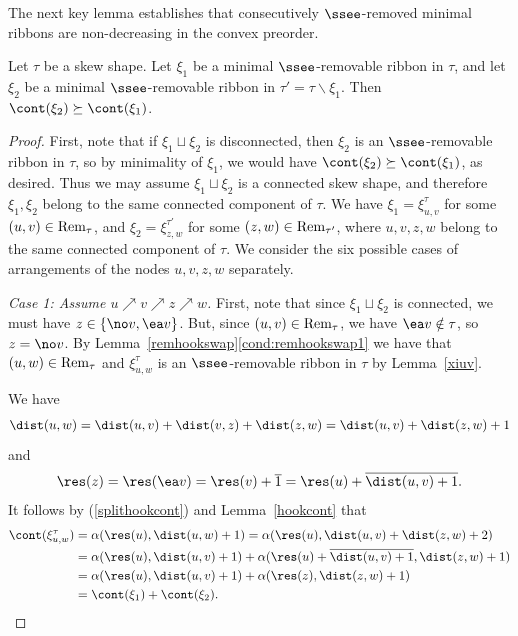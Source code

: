 The next key lemma establishes that consecutively \(\ssee\)-removed minimal ribbons are non-decreasing in the convex preorder. 

 \begin{lemma}\label{remsinorder}
Let \(\tau\) be a skew shape. Let \(\xi_1\) be a minimal \(\ssee\)-removable ribbon in \(\tau\), and let \(\xi_2\) be a minimal \(\ssee\)-removable ribbon in \(\tau'=\tau\backslash \xi_1\). Then \(\cont(\xi_2) \succeq \cont(\xi_1)\).
 \end{lemma}
 \begin{proof}
First, note that if \(\xi_1 \sqcup \xi_2\) is disconnected, then \(\xi_2\) is an \(\ssee\)-removable ribbon in \(\tau\), so by minimality of \(\xi_1\), we would have \(\cont(\xi_2) \succeq \cont(\xi_1)\), as desired. Thus we may assume \(\xi_1 \sqcup \xi_2\) is a connected skew shape, and therefore \(\xi_1, \xi_2\) belong to the same connected component of \(\tau\). 
  We have \(\xi_1 = \xi^\tau_{u,v}\) for some \((u,v) \in \textup{Rem}_\tau\), and \(\xi_2 = \xi^{\tau'}_{z,w}\) for some \((z,w) \in \textup{Rem}_{\tau'}\), where \(u,v,z,w\) belong to the same connected component of \(\tau\).  
We consider the six possible cases of arrangements of the nodes \(u,v,z,w\) separately.
 
 {\em Case 1: Assume \(u \nearrow v \nearrow z \nearrow w\).} First, note that since \(\xi_1 \sqcup \xi_2\) is connected, we must have \(z \in \{\no v, \ea v\}\). But, since \((u,v) \in \textup{Rem}_\tau\), we have \(\ea v \notin \tau\), so \(z=\no v\). 
By Lemma~\ref{remhookswap}\eqref{cond:remhookswap1} we have that \((u,w) \in \textup{Rem}_\tau\) and \(\xi^\tau_{u,w}\) is an \(\ssee\)-removable ribbon in \(\tau\) by Lemma~\ref{xiuv}.
 
We have
\begin{align*}
\dist(u,w) = 
\dist(u,v) + \dist(v,z) + \dist(z,w) = 
 \dist(u,v) + \dist(z,w) + 1
\end{align*}
and
\begin{align*}
\res(z) = \res(\ea v) = \res(v) + \overline{1} = \res(u) + \overline{\dist(u,v) + 1}.
\end{align*}
It follows by (\ref{splithookcont}) and Lemma~\ref{hookcont} that 
\begin{align*}
\cont(\xi^\tau_{u,w}) &= \alpha(\res(u), \dist(u,w)+1) = \alpha(\res(u),  \dist(u,v) + \dist(z,w) + 2)\\
&= \alpha(\res(u), \dist(u,v)+1) + \alpha(\res(u) + \overline{\dist(u,v)+1}, \dist(z,w)+1)\\
&= \alpha(\res(u),  \dist(u,v)+1) + \alpha(\res(z), \dist(z,w)+1)\\
&= \cont(\xi_1) + \cont(\xi_2).
\end{align*}


\end{proof}
